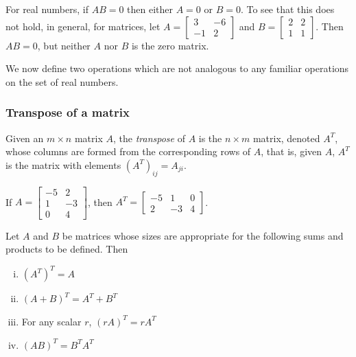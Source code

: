\documentclass[12pt,letterpaper,reqno]{article}
\numberwithin{equation}{section}
\newcommand{\ti}[1]{\textit{#1}}
\begin{document}
\begin{example}
	For real numbers, if $AB=0$ then either $A=0$ or $B=0$. To see that this does not hold, in general, for matrices, let $A=\begin{bmatrix}
		3&-6 \\ -1&2
	\end{bmatrix}$ and $B=\begin{bmatrix}
	2 & 2 \\ 1 & 1
\end{bmatrix}$. Then $AB=0$, but neither $A$ nor $B$ is the zero matrix. 
\end{example}

We now define two operations which are not analogous to any familiar operations on the set of real numbers.

\subsubsection{Transpose of a matrix}
\begin{defn}
	Given an $m \times n$ matrix $A$, the \ti{transpose} of $A$ is the $n \times m$ matrix, denoted $A^T$, whose columns are formed from the corresponding rows of $A$, that is, given $A$, $A^T$ is the matrix with elements $(A^T)_{ij}=A_{ji}$. 
\end{defn}

\begin{example}
	If $A=\begin{bmatrix}
	-5&2\\1&-3 \\ 0&4
\end{bmatrix}$, then $A^T=\begin{bmatrix}
	-5&1&0 \\ 2&-3&4
\end{bmatrix}$.
\end{example}

\begin{thm}[Properties of $A^T$]\label{thm:transpose_properties}
	Let $A$ and $B$ be matrices whose sizes are appropriate for the following sums and products to be defined. Then
\begin{enumerate}[(i)]
	\item $(A^T)^T=A$
	\item $(A+B)^T=A^T+B^T$
	\item For any scalar $r$, $(rA)^T=rA^T$
	\item $(AB)^T=B^TA^T$
\end{enumerate}
\end{thm}
\end{document}
